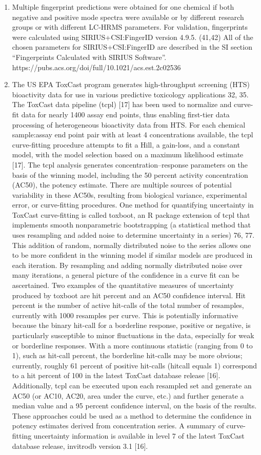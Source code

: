 \begin{enumerate}
    \item Multiple fingerprint predictions were obtained for one chemical if both negative and positive mode spectra were available or by different research groups or with different LC-HRMS parameters. For validation, fingerprints were calculated using SIRIUS+CSI:FingerID version 4.9.5. (41,42) All of the chosen parameters for SIRIUS+CSI:FingerID are described in the SI section “Fingerprints Calculated with SIRIUS Software”. https://pubs.acs.org/doi/full/10.1021/acs.est.2c02536
    \item The US EPA ToxCast program generates high-throughput screening (HTS) bioactivity data for use in various predictive toxicology applications 32, 35. The ToxCast data pipeline (tcpl) [17] has been used to normalize and curve-fit data for nearly 1400 assay end points, thus enabling first-tier data processing of heterogeneous bioactivity data from HTS. For each chemical sample:assay end point pair with at least 4 concentrations available, the tcpl curve-fitting procedure attempts to fit a Hill, a gain-loss, and a constant model, with the model selection based on a maximum likelihood estimate [17]. The tcpl analysis generates concentration–response parameters on the basis of the winning model, including the 50 percent activity concentration (AC50), the potency estimate. There are multiple sources of potential variability in these AC50s, resulting from biological variance, experimental error, or curve-fitting procedures. One method for quantifying uncertainty in ToxCast curve-fitting is called toxboot, an R package extension of tcpl that implements smooth nonparametric bootstrapping (a statistical method that uses resampling and added noise to determine uncertainty in a series) 76, 77. This addition of random, normally distributed noise to the series allows one to be more confident in the winning model if similar models are produced in each iteration. By resampling and adding normally distributed noise over many iterations, a general picture of the confidence in a curve fit can be ascertained. Two examples of the quantitative measures of uncertainty produced by toxboot are hit percent and an AC50 confidence interval. Hit percent is the number of active hit-calls of the total number of resamples, currently with 1000 resamples per curve. This is potentially informative because the binary hit-call for a borderline response, positive or negative, is particularly susceptible to minor fluctuations in the data, especially for weak or borderline responses. With a more continuous statistic (ranging from 0 to 1), such as hit-call percent, the borderline hit-calls may be more obvious; currently, roughly 61 percent of positive hit-calls (hitcall equals 1) correspond to a hit percent of 100 in the latest ToxCast database release [16]. Additionally, tcpl can be executed upon each resampled set and generate an AC50 (or AC10, AC20, area under the curve, etc.) and further generate a median value and a 95 percent confidence interval, on the basis of the results. These approaches could be used as a method to determine the confidence in potency estimates derived from concentration series. A summary of curve-fitting uncertainty information is available in level 7 of the latest ToxCast database release, invitrodb version 3.1 [16].

\end{enumerate}
